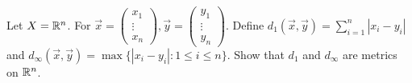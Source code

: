 \documentclass[a4paper]{article}
\begin{document}
\begin{problem}
    Let \( X = \mathbb{R}^{n} \). For \( \vec{ x }  = \begin{pmatrix} {x}_{1} \\ \vdots \\ {x}_{n} \end{pmatrix} , \vec{ y }  = \begin{pmatrix} {y}_{1} \\ \vdots \\ {y}_{n} \end{pmatrix}  \). Define \( {d}_{1}(\vec{ x } , \vec{ y } ) = \displaystyle  \sum_{ i=1  }^{ n } | {x}_{i} - {y}_{i} |  \) and \( {d}_{\infty }(\vec{ x } , \vec{ y } ) = \max \{ | {x}_{i} - {y}_{i} | : 1 \leq i \leq n   \}    \).
    Show that \( {d}_{1}  \) and \( {d}_{\infty } \) are metrics on \( \mathbb{R}^{n} \).
\end{problem}
\end{document}
